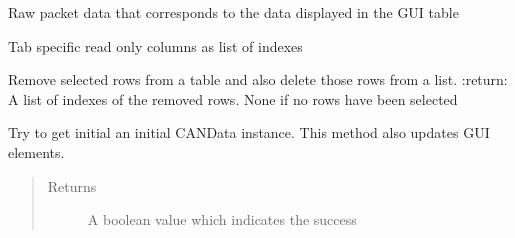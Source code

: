 \documentclass[letterpaper,10pt,english]{sphinxmanual}
\begin{document}
\begin{fulllineitems}
\begin{fulllineitems}
\end{fulllineitems}


\begin{fulllineitems}
\label{\detokenize{src:src.AbstractTab.AbstractTab.rawData}}
Raw packet data that corresponds to the data displayed in the GUI table

\end{fulllineitems}


\begin{fulllineitems}
\label{\detokenize{src:src.AbstractTab.AbstractTab.readOnlyCols}}
Tab specific read only columns as list of indexes

\end{fulllineitems}


\begin{fulllineitems}
\label{\detokenize{src:src.AbstractTab.AbstractTab.removeSelectedPackets}}
Remove selected rows from a table and also delete those rows from a  list.
:return: A list of indexes of the removed rows. None if no rows have been selected

\end{fulllineitems}


\begin{fulllineitems}
\label{\detokenize{src:src.AbstractTab.AbstractTab.setInitialCANData}}
Try to get initial an initial CANData instance.
This method also updates GUI elements.
\begin{quote}\begin{description}
\item[{Returns}] \leavevmode
A boolean value which indicates the success

\end{description}\end{quote}

\end{fulllineitems}


\end{fulllineitems}
\end{document}
